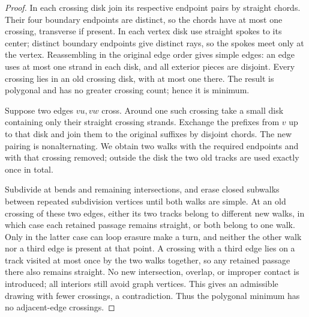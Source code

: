 \documentclass[11pt,a4paper]{article}
\theoremstyle{remark}
\numberwithin{equation}{section}
\begin{document}
\begin{proof}
In each crossing disk join its respective endpoint pairs by
straight chords. Their four boundary endpoints are distinct, so
the chords have at most one crossing, transverse if present.
In each vertex disk use straight spokes to its center; distinct
boundary endpoints give distinct rays, so the spokes meet only
at the vertex. Reassembling in the original edge order gives
simple edges: an edge uses at most one strand in each disk,
and all exterior pieces are disjoint. Every crossing lies in
an old crossing disk, with at most one there. The result is
polygonal and has no greater crossing count; hence it is minimum.

Suppose two edges \(vu,vw\) cross. Around one such crossing take
a small disk containing only their straight crossing strands.
Exchange the prefixes from \(v\) up to that disk and join them
to the original suffixes by disjoint chords. The new pairing
is nonalternating. We obtain two walks with the required endpoints
and with that crossing removed; outside the disk the two old
tracks are used exactly once in total.

Subdivide at bends and remaining intersections, and erase closed
subwalks between repeated subdivision vertices until both walks
are simple. At an old crossing of these two edges, either its
two tracks belong to different new walks, in which case each
retained passage remains straight, or both belong to one walk.
Only in the latter case can loop erasure make a turn, and neither
the other walk nor a third edge is present at that point.
A crossing with a third edge lies on a track visited at most
once by the two walks together, so any retained passage there
also remains straight. No new intersection, overlap, or improper
contact is introduced; all interiors still avoid graph vertices.
This gives an admissible drawing with fewer crossings, a
contradiction. Thus the polygonal minimum has no adjacent-edge
crossings.
\end{proof}

\begingroup
\raggedright


\endgroup
\end{document}
